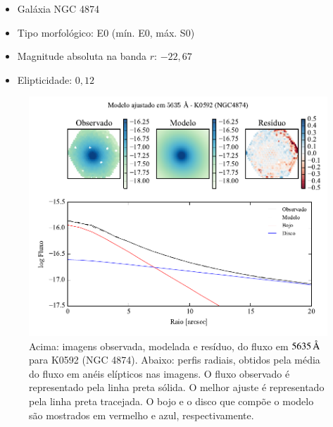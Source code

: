 \begin{itemize}
  \item Galáxia NGC 4874
  \item Tipo morfológico: E0 (mín. E0, máx. S0)
  \item Magnitude absoluta na banda $r$: $-22,67$
  \item Elipticidade: $0,12$
\end{itemize}

\begin{figure}
	\includegraphics[page=1]{figuras-decomp/K0592_sample006a}
	\caption[Ajuste morfológico em $5635\,\angstrom$ de K0592 (NGC 4874)]
	{Acima: imagens observada, modelada e resíduo, do fluxo em $5635\,\angstrom$
	para K0592 (NGC 4874). Abaixo: perfis radiais, obtidos pela média do fluxo em
	anéis elípticos nas imagens. O fluxo observado é representado pela linha preta
	sólida. O melhor ajuste é representado pela linha preta tracejada. O bojo e o
	disco que compõe o modelo são mostrados em vermelho e azul, respectivamente.}
	\label{fig:decompRadprof:K0592}
\end{figure}

